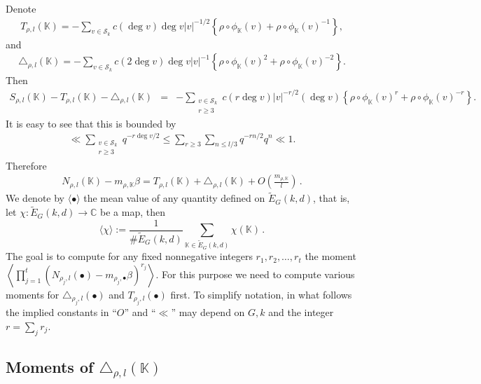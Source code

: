 \documentclass[12pt]{amsart}
\theoremstyle{plain}
\begin{document}
Denote
\begin{eqnarray} \label{3:TK} T_{\rho,l}({{\mathbb K}})=- \sum_{v \in {\mathcal{S}_k}} c(\deg v) \deg v |v|^{-1/2} \left\{ \rho \circ {\phi_{{\mathbb K}}}(v)+\rho \circ {\phi_{{\mathbb K}}}(v)^{-1}\right\}, \end{eqnarray}
and
\begin{eqnarray} \label{3:triangle} \triangle_{\rho,l}({{\mathbb K}})=- \sum_{v \in {\mathcal{S}_k} } c(2\deg v) \deg v |v|^{-1} \left\{ \rho \circ {\phi_{{\mathbb K}}}(v)^{2}+\rho \circ {\phi_{{\mathbb K}}}(v)^{-2}\right\}. \end{eqnarray}
Then
\begin{eqnarray*} S_{\rho,l}({{\mathbb K}})-T_{\rho,l}({{\mathbb K}})-\triangle_{\rho,l}({{\mathbb K}})&=&-\sum_{\substack{v \in {\mathcal{S}_k}\\
r \ge 3}} c(r \deg v) |v|^{-r/2} (\deg v) \left\{ \rho \circ {\phi_{{\mathbb K}}}(v)^r+\rho \circ {\phi_{{\mathbb K}}}(v)^{-r}\right\}. \end{eqnarray*}
It is easy to see that this is bounded by
\begin{eqnarray*}
\ll \sum_{\substack{v \in {\mathcal{S}_k}\\
r \ge 3}} q^{-r \deg v/2} \le \sum_{r \ge 3} \sum_{n \le l/3} q^{-rn/2} q^n \ll 1.  \end{eqnarray*}
Therefore
\begin{eqnarray} \label{3:id2} N_{\rho,l}({{\mathbb K}})-{m_{\rho,{{\mathbb K}}}}\beta=T_{\rho,l}({{\mathbb K}})+\triangle_{\rho,l}({{\mathbb K}})+O\left(\frac{m_{\rho,{{\mathbb K}}}}{l}\right)\,.
\end{eqnarray}
We denote by $\langle \bullet \rangle$ the mean value of any quantity defined on ${\widetilde{E}_G(k,d)}$, that is, let $\chi: {\widetilde{E}_G(k,d)} \to {{\mathbb C}}$ be a map, then
\[\langle \chi \rangle:=\frac{1}{\# {\widetilde{E}_G(k,d)}} \sum_{{{\mathbb K}} \in {\widetilde{E}_G(k,d)}} \chi({{\mathbb K}})\,. \]
The goal is to compute for any fixed nonnegative integers $r_1,r_2,\ldots,r_t$ the moment $\left\langle \prod_{j=1}^t\left(N_{\rho_j,l}(\bullet)-m_{\rho_j,\bullet} \beta\right)^{r_j}\right\rangle$. For this purpose we need to compute various moments for $\triangle_{\rho_j,l}(\bullet)$ and $T_{\rho_j,l}(\bullet)$ first. To simplify notation, in what follows the implied constants in ``$O$'' and ``$\ll $'' may depend on $G,k$ and the integer $r=\sum_j r_j$.

\subsection{Moments of $\triangle_{\rho,l}({{\mathbb K}})$}
\end{document}
